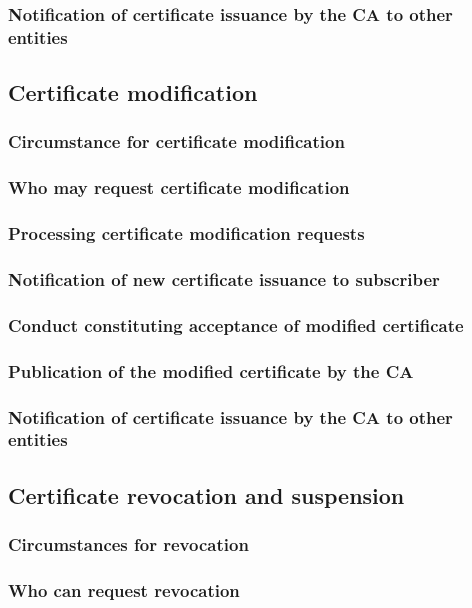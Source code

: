 \documentclass[10pt]{article}
\begin{document}
\subsubsection{Notification of certificate issuance by the CA to other entities}
\subsection{Certificate modification}
\subsubsection{Circumstance for certificate modification}
\subsubsection{Who may request certificate modification}
\subsubsection{Processing certificate modification requests}
\subsubsection{Notification of new certificate issuance to subscriber}
\subsubsection{Conduct constituting acceptance of modified certificate}
\subsubsection{Publication of the modified certificate by the CA}
\subsubsection{Notification of certificate issuance by the CA to other entities}
\subsection{Certificate revocation and suspension}
\subsubsection{Circumstances for revocation}
\subsubsection{Who can request revocation}
\end{document}
